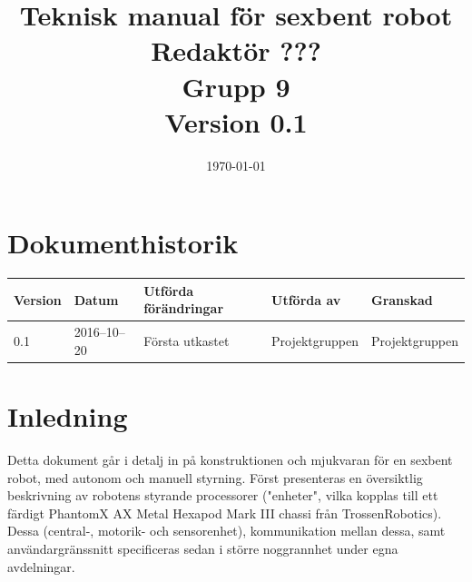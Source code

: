 \documentclass[a4paper,titlepage,12pt]{article}
\begin{document}
\listoftodos
	\title{\LARGE
		\textbf{Teknisk manual för sexbent robot} \\
		\vspace*{0.5\baselineskip}
		\large
		Redaktör ??? \\
		Grupp 9 \\
		\small
		\vspace*{0.5\baselineskip}
		Version 0.1}

	\date{\today}

	\maketitle
	
	\newpage

	\tableofcontents
	\newpage



	\section*{Dokumenthistorik}
	\renewcommand*{\arraystretch}{1.4}
    \begin{longtable}[c]{ l l >{\raggedright}p{5cm} >{\raggedright}p{3cm} l }
		\textbf{Version} & \textbf{Datum} & \textbf{Utförda förändringar} 
		& \textbf{Utförda av} & \textbf{Granskad} \\ \midrule
		
		0.1 & 2016--10--20 & Första utkastet & Projektgruppen &
        Projektgruppen \\
            
	\end{longtable}


	\newpage

	\raggedright

	\section{Inledning}
	Detta dokument går i detalj in på konstruktionen och mjukvaran för en
    sexbent robot, med autonom och manuell styrning. Först presenteras en
    översiktlig beskrivning av robotens styrande processorer ("enheter", vilka
    kopplas till ett färdigt PhantomX AX Metal Hexapod Mark III chassi från
    TrossenRobotics). Dessa (central-, motorik- och sensorenhet), kommunikation
    mellan dessa, samt användargränssnitt specificeras sedan i större
    noggrannhet under egna avdelningar.
\end{document}
